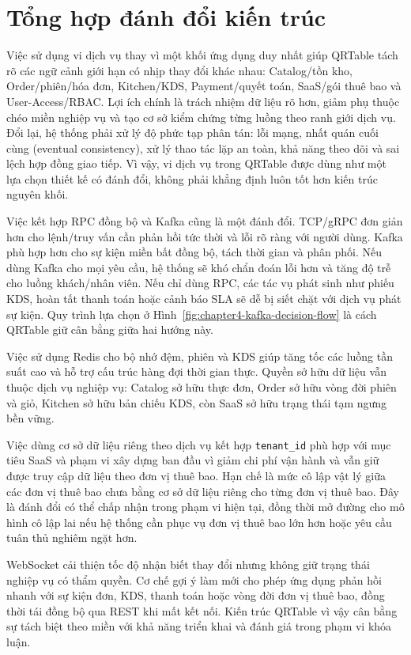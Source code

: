 \section{Tổng hợp đánh đổi kiến trúc}

Việc sử dụng vi dịch vụ thay vì một khối ứng dụng duy nhất giúp QRTable tách rõ các ngữ cảnh giới hạn có nhịp thay đổi khác nhau: Catalog/tồn kho, Order/phiên/hóa đơn, Kitchen/KDS, Payment/quyết toán, SaaS/gói thuê bao và User-Access/RBAC. Lợi ích chính là trách nhiệm dữ liệu rõ hơn, giảm phụ thuộc chéo miền nghiệp vụ và tạo cơ sở kiểm chứng từng luồng theo ranh giới dịch vụ. Đổi lại, hệ thống phải xử lý độ phức tạp phân tán: lỗi mạng, nhất quán cuối cùng (eventual consistency), xử lý thao tác lặp an toàn, khả năng theo dõi và sai lệch hợp đồng giao tiếp. Vì vậy, vi dịch vụ trong QRTable được dùng như một lựa chọn thiết kế có đánh đổi, không phải khẳng định luôn tốt hơn kiến trúc nguyên khối.

Việc kết hợp RPC đồng bộ và Kafka cũng là một đánh đổi. TCP/gRPC đơn giản hơn cho lệnh/truy vấn cần phản hồi tức thời và lỗi rõ ràng với người dùng. Kafka phù hợp hơn cho sự kiện miền bất đồng bộ, tách thời gian và phân phối. Nếu dùng Kafka cho mọi yêu cầu, hệ thống sẽ khó chẩn đoán lỗi hơn và tăng độ trễ cho luồng khách/nhân viên. Nếu chỉ dùng RPC, các tác vụ phát sinh như phiếu KDS, hoàn tất thanh toán hoặc cảnh báo SLA sẽ dễ bị siết chặt với dịch vụ phát sự kiện. Quy trình lựa chọn ở Hình~\ref{fig:chapter4-kafka-decision-flow} là cách QRTable giữ cân bằng giữa hai hướng này.

Việc sử dụng Redis cho bộ nhớ đệm, phiên và KDS giúp tăng tốc các luồng tần suất cao và hỗ trợ cấu trúc hàng đợi thời gian thực. Quyền sở hữu dữ liệu vẫn thuộc dịch vụ nghiệp vụ: Catalog sở hữu thực đơn, Order sở hữu vòng đời phiên và giỏ, Kitchen sở hữu bản chiếu KDS, còn SaaS sở hữu trạng thái tạm ngưng bền vững.

Việc dùng cơ sở dữ liệu riêng theo dịch vụ kết hợp \texttt{tenant\_id} phù hợp với mục tiêu SaaS và phạm vi xây dựng ban đầu vì giảm chi phí vận hành và vẫn giữ được truy cập dữ liệu theo đơn vị thuê bao. Hạn chế là mức cô lập vật lý giữa các đơn vị thuê bao chưa bằng cơ sở dữ liệu riêng cho từng đơn vị thuê bao. Đây là đánh đổi có thể chấp nhận trong phạm vi hiện tại, đồng thời mở đường cho mô hình cô lập lai nếu hệ thống cần phục vụ đơn vị thuê bao lớn hơn hoặc yêu cầu tuân thủ nghiêm ngặt hơn.

WebSocket cải thiện tốc độ nhận biết thay đổi nhưng không giữ trạng thái nghiệp vụ có thẩm quyền. Cơ chế gợi ý làm mới cho phép ứng dụng phản hồi nhanh với sự kiện đơn, KDS, thanh toán hoặc vòng đời đơn vị thuê bao, đồng thời tái đồng bộ qua REST khi mất kết nối. Kiến trúc QRTable vì vậy cân bằng sự tách biệt theo miền với khả năng triển khai và đánh giá trong phạm vi khóa luận.
